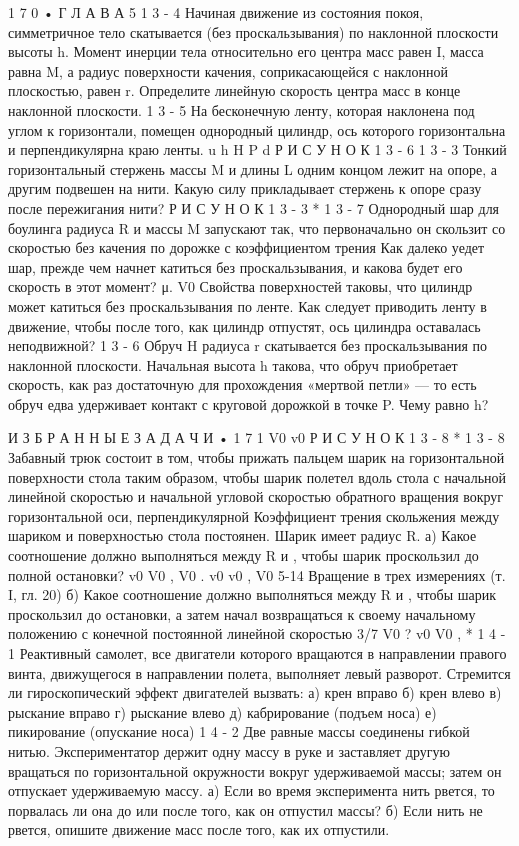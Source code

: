 \documentclass[10pt,oneside]{article}
\begin{document}
1 7 0 • Г Л А В А  5 \emph{ } 1 3 - 4 Начиная движение из состояния покоя, симметричное тело скатывается (без проскальзывания) по наклонной плоскости высоты h. Момент инерции тела относительно его центра масс равен I, масса равна M, а радиус поверхности качения, соприкасающейся с наклонной плоскостью, равен r. Определите линейную скорость центра масс в конце наклонной плоскости. \emph{ } 1 3 - 5 На бесконечную ленту, которая наклонена под углом к горизонтали, помещен однородный цилиндр, ось которого горизонтальна и перпендикулярна краю ленты. u h H P d Р И С У Н О К  1 3 - 6 \emph{ } 1 3 - 3 Тонкий горизонтальный стержень массы M и длины L одним концом лежит на опоре, а другим подвешен на нити. Какую силу прикладывает стержень к опоре сразу после пережигания нити? Р И С У Н О К  1 3 - 3 \emph{ } * 1 3 - 7 Однородный шар для боулинга радиуса R и массы M запускают так, что первоначально он скользит со скоростью без качения по дорожке с коэффициентом трения Как далеко уедет шар, прежде чем начнет катиться без проскальзывания, и какова будет его скорость в этот момент? μ. V0 Свойства поверхностей таковы, что цилиндр может катиться без проскальзывания по ленте. Как следует приводить ленту в движение, чтобы после того, как цилиндр отпустят, ось цилиндра оставалась неподвижной? \emph{ } 1 3 - 6 Обруч H радиуса r скатывается без проскальзывания по наклонной плоскости. Начальная высота h такова, что обруч приобретает скорость, как раз достаточную для прохождения «мертвой петли» --- то есть обруч едва удерживает контакт с круговой дорожкой в точке P. Чему равно h?\par

И З Б Р А Н Н Ы Е  З А Д А Ч И • 1 7 1 V0 v0 Р И С У Н О К  1 3 - 8 \emph{ } * 1 3 - 8 Забавный трюк состоит в том, чтобы прижать пальцем шарик на горизонтальной поверхности стола таким образом, чтобы шарик полетел вдоль стола с начальной линейной скоростью и начальной угловой скоростью обратного вращения вокруг горизонтальной оси, перпендикулярной Коэффициент трения скольжения между шариком и поверхностью стола постоянен. Шарик имеет радиус R. а) Какое соотношение должно выполняться между R и , чтобы шарик проскользил до полной остановки? v0 V0 , V0 . v0 v0 , V0 5-14 Вращение в трех измерениях (т. I, гл. 20) б) Какое соотношение должно выполняться между R и , чтобы шарик проскользил до остановки, а затем начал возвращаться к своему начальному положению с конечной постоянной линейной скоростью 3/7 V0 ? v0 V0 , * 1 4 - 1 Реактивный самолет, все двигатели которого вращаются в направлении правого винта, движущегося в направлении полета, выполняет левый разворот. Стремится ли гироскопический эффект двигателей вызвать: а) крен вправо б) крен влево в) рыскание вправо г) рыскание влево д) кабрирование (подъем носа) е) пикирование (опускание носа) \emph{ } 1 4 - 2 Две равные массы соединены гибкой нитью. Экспериментатор держит одну массу в руке и заставляет другую вращаться по горизонтальной окружности вокруг удерживаемой массы; затем он отпускает удерживаемую массу. а) Если во время эксперимента нить рвется, то порвалась ли она до или после того, как он отпустил массы? б) Если нить не рвется, опишите движение масс после того, как их отпустили.\par
\end{document}
